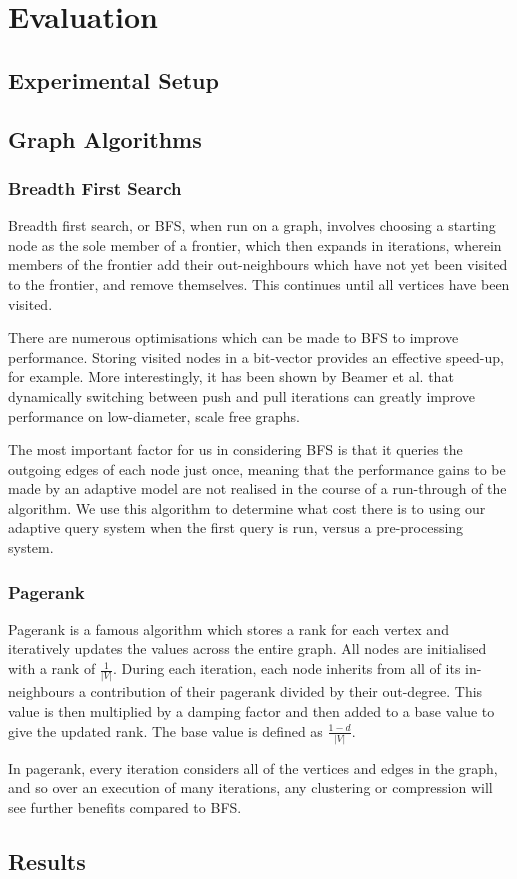 \chapter{Evaluation}

\label{ch:evaluation}

\section{Experimental Setup}

\section{Graph Algorithms}

\subsection{Breadth First Search}

Breadth first search, or BFS, when run on a graph, involves choosing a starting node as the sole
member of a frontier, which then expands in iterations, wherein members of the frontier add their
out-neighbours which have not yet been visited to the frontier, and remove themselves. This continues
until all vertices have been visited.

There are numerous optimisations which can be made to BFS to improve performance. Storing visited
nodes in a bit-vector provides an effective speed-up, for example. More interestingly, it has been
shown by Beamer et al. that dynamically switching between push and pull iterations can greatly
improve performance on low-diameter, scale free graphs.

The most important factor for us in considering BFS is that it queries the outgoing edges of each
node just once, meaning that the performance gains to be made by an adaptive model are not realised
in the course of a run-through of the algorithm. We use this algorithm to determine what cost there
is to using our adaptive query system when the first query is run, versus a pre-processing system.

\subsection{Pagerank}

Pagerank is a famous algorithm which stores a rank for each vertex and iteratively updates the values
across the entire graph. All nodes are initialised with a rank of $\frac{1}{|V|}$. During each
iteration, each node inherits from all of its in-neighbours a contribution of their pagerank divided
by their out-degree. This value is then multiplied by a damping factor and then added to a base value
to give the updated rank. The base value is defined as $\frac{1 - d}{|V|}$.

In pagerank, every iteration considers all of the vertices and edges in the graph, and so over
an execution of many iterations, any clustering or compression will see further benefits compared to
BFS.

\section{Results}
